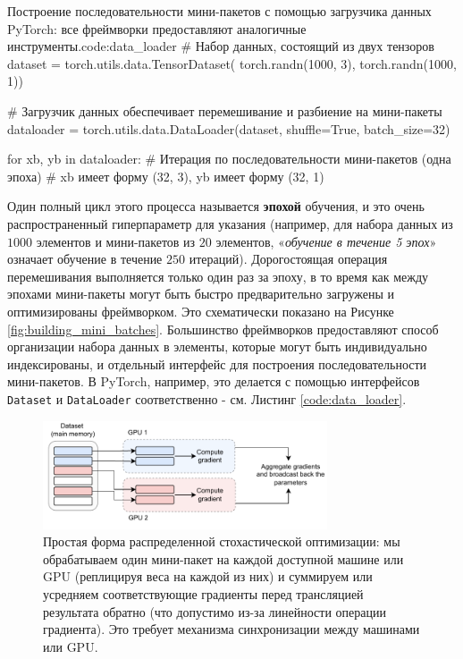 \begin{mypy}{Построение последовательности мини-пакетов с помощью загрузчика данных PyTorch: все фреймворки предоставляют аналогичные инструменты.}{code:data_loader}
# Набор данных, состоящий из двух тензоров
dataset = torch.utils.data.TensorDataset(
    torch.randn(1000, 3), torch.randn(1000, 1))

# Загрузчик данных обеспечивает перемешивание и разбиение на мини-пакеты
dataloader = torch.utils.data.DataLoader(dataset, 
                shuffle=True, batch_size=32)

for xb, yb in dataloader:
  # Итерация по последовательности мини-пакетов (одна эпоха)
  # xb имеет форму (32, 3), yb имеет форму (32, 1)
\end{mypy}

Один полный цикл этого процесса называется \textbf{эпохой} обучения, и это очень распространенный гиперпараметр для указания (например, для набора данных из $1000$ элементов и мини-пакетов из $20$ элементов, «\textit{обучение в течение 5 эпох}» означает обучение в течение $250$ итераций). Дорогостоящая операция перемешивания выполняется только один раз за эпоху, в то время как между эпохами мини-пакеты могут быть быстро предварительно загружены и оптимизированы фреймворком. Это схематически показано на Рисунке \ref{fig:building_mini_batches}. Большинство фреймворков предоставляют способ организации набора данных в элементы, которые могут быть индивидуально  индексированы, и отдельный интерфейс для построения последовательности мини-пакетов. В PyTorch, например, это делается с помощью интерфейсов {\footnotesize\texttt{Dataset}} и {\footnotesize\texttt{DataLoader}} соответственно - см. Листинг \ref{code:data_loader}.


\begin{figure}
    \centering
    \includegraphics[width=0.75\textwidth]{images/mini_batch.pdf}
    \caption{Простая форма распределенной стохастической оптимизации: мы обрабатываем один мини-пакет на каждой доступной машине или GPU (реплицируя веса на каждой из них) и суммируем или усредняем
    соответствующие градиенты перед трансляцией результата обратно (что допустимо из-за линейности операции градиента). Это требует механизма синхронизации между машинами или GPU.}
    \label{fig:mini_batch}
\end{figure}

